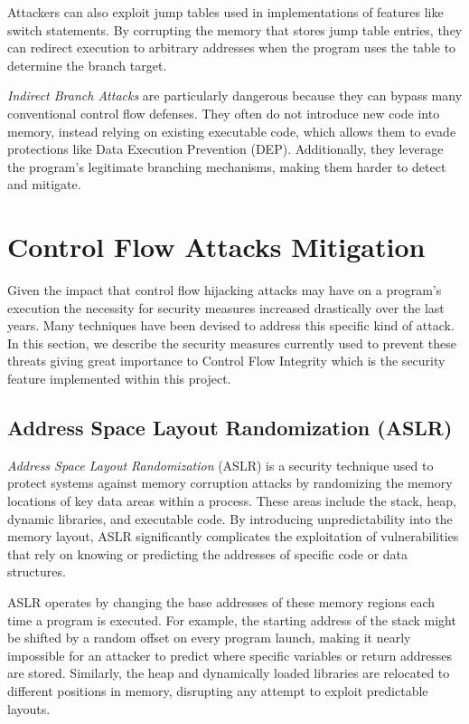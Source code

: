 Attackers can also exploit jump tables used in implementations of features like switch
statements. By corrupting the memory that stores jump table entries, they can redirect
execution to arbitrary addresses when the program uses the table to determine the
branch target.

\textit{Indirect Branch Attacks} are particularly dangerous because they can
bypass many conventional control flow defenses. They often do not introduce new code
into memory, instead relying on existing executable code, which allows them to evade
protections like Data Execution Prevention (DEP). Additionally, they leverage the
program's legitimate branching mechanisms, making them harder to detect and
mitigate.

\section{Control Flow Attacks Mitigation}
\label{sec:background_mitigation}

Given the impact that control flow hijacking attacks may have on a program's execution
the necessity for security measures increased drastically over the last years.
Many techniques have been devised to address this specific kind of attack. In this
section, we describe the security measures currently used to prevent these
threats giving great importance to Control Flow Integrity which is the security
feature implemented within this project.

\subsection{Address Space Layout Randomization (ASLR)}
\label{subsec:background_aslr}

\textit{Address Space Layout Randomization} (ASLR) is a security technique used
to protect systems against memory corruption attacks by randomizing the memory
locations of key data areas within a process. These areas include the stack,
heap, dynamic libraries, and executable code. By introducing unpredictability into
the memory layout, ASLR significantly complicates the exploitation of
vulnerabilities that rely on knowing or predicting the addresses of specific
code or data structures.

ASLR operates by changing the base addresses of these memory regions each time a
program is executed. For example, the starting address of the stack might be
shifted by a random offset on every program launch, making it nearly impossible for
an attacker to predict where specific variables or return addresses are stored.
Similarly, the heap and dynamically loaded libraries are relocated to different positions
in memory, disrupting any attempt to exploit predictable layouts.

